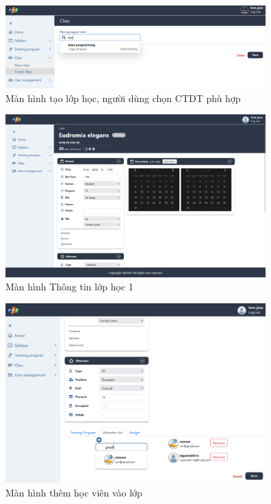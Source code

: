 \documentclass[report.tex]{subfiles}
\begin{document}
\begin{figure}[!htb]
{\centering
\includegraphics[width=380px]{../meta/ui.class-create1.png}
\caption[Màn hình tạo lớp học]{Màn hình tạo lớp học, người dùng chọn CTDT phù hợp}
\par
}
\end{figure}
\FloatBarrier

\begin{figure}[!htb]
{\centering
\includegraphics[width=380px]{../meta/ui.class-detail.png}
\caption{Màn hình Thông tin lớp học 1}
\par
}
\end{figure}
\FloatBarrier

\begin{figure}[!htb]
{\centering
\includegraphics[width=380px]{../meta/ui.class-attendee.png}
\caption{Màn hình thêm học viên vào lớp}
\par
}
\end{figure}
\FloatBarrier
\end{document}
